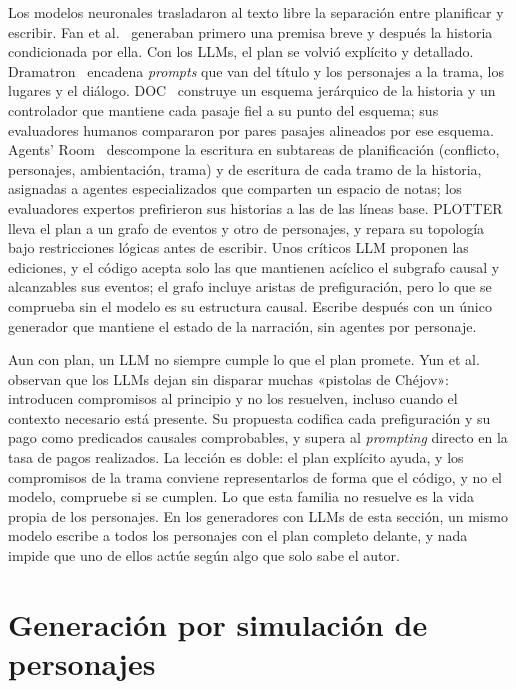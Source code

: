 Los modelos neuronales trasladaron al texto libre la separación entre planificar y escribir. Fan
et al.~\cite{fan2018} generaban primero una premisa breve y después la historia condicionada por
ella. Con los LLMs, el plan se volvió explícito y detallado. Dramatron~\cite{mirowski2023}
encadena \textit{prompts} que van del título y los personajes a la trama, los lugares y el diálogo.
DOC~\cite{yang2023}
construye un esquema jerárquico de la historia y un controlador que mantiene cada pasaje fiel a su
punto del esquema; sus evaluadores humanos compararon por pares pasajes alineados por ese esquema.
Agents' Room~\cite{huot2025} descompone la escritura en subtareas de planificación (conflicto,
personajes, ambientación, trama) y de escritura de cada tramo de la historia, asignadas a agentes
especializados que comparten un espacio de notas; los evaluadores expertos prefirieron sus
historias a las de las líneas base. PLOTTER~\cite{gu2026} lleva el plan a un grafo de eventos y otro
de personajes, y repara su topología bajo restricciones lógicas antes de escribir. Unos críticos LLM
proponen las ediciones, y el código acepta solo las que mantienen acíclico el subgrafo causal y
alcanzables sus eventos; el grafo incluye aristas de prefiguración, pero lo que se comprueba sin el
modelo es su estructura causal. Escribe después con un único generador que mantiene el estado de la
narración, sin agentes por personaje.

Aun con plan, un LLM no siempre cumple lo que el plan promete. Yun et al.~\cite{yun2026} observan
que los LLMs dejan sin disparar muchas «pistolas de Chéjov»: introducen compromisos al principio y
no los resuelven, incluso cuando el contexto necesario está presente. Su propuesta codifica cada
prefiguración y su pago como predicados causales comprobables, y supera al \textit{prompting}
directo en la tasa de pagos realizados. La lección es doble: el plan explícito ayuda, y los
compromisos de la trama conviene representarlos de forma que el código, y no el modelo, compruebe
si se cumplen. Lo que esta familia no resuelve es la vida propia de los personajes. En los
generadores con LLMs de esta sección, un mismo modelo escribe a todos los personajes con el plan completo
delante, y nada impide que uno de ellos actúe según algo que solo sabe el autor.

\section{Generación por simulación de personajes}\label{sec:bottom-up}

